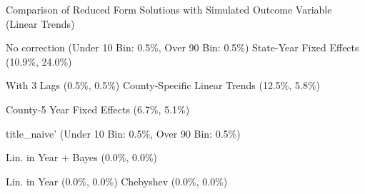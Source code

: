 \caption{Comparison of Reduced Form Solutions with Simulated Outcome Variable (Linear Trends) \label{fig:distributions-existing-solutions}}
\caption*{\color{p1line}{\textbf{\textemdash\textemdash}} No correction (Under 10 Bin: 0.5\%, Over 90 Bin: 0.5\%) \hspace{1cm} \color{p2line}{- - -} State-Year Fixed Effects (10.9\%, 24.0\%)}
\caption*{\color{p3line}{\textbf{- - -}} With 3 Lags (0.5\%, 0.5\%) \hspace{1cm} \color{p4line}{\textbf{- - -}} County-Specific Linear Trends (12.5\%, 5.8\%)}
\caption*{\color{p5line}{\textbf{- - -}} County-5 Year Fixed Effects (6.7\%, 5.1\%)}


\caption*{\color{p1line}{\textbf{\textemdash\textemdash}} title_naive' (Under 10 Bin: 0.5\%, Over 90 Bin: 0.5\%)}
\caption*{\color{p2line}{\textbf{- - -}} Lin. in Year + Bayes (0.0\%, 0.0\%)}
\caption*{\color{p3line}{\textbf{- - -}} Lin. in Year (0.0\%, 0.0\%) \hspace{1cm} \color{p4line}{\textbf{- - -}} Chebyshev (0.0\%, 0.0\%)}